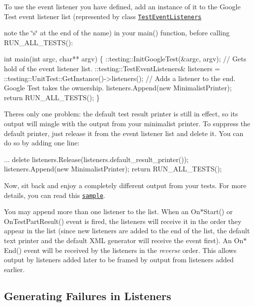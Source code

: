To use the event listener you have defined, add an instance of it to the Google Test event listener list (represented by class \href{../include/gtest/gtest.h#L929}{\tt Test\+Event\+Listeners}
\begin{DoxyItemize}
\item note the \char`\"{}s\char`\"{} at the end of the name) in your {\ttfamily main()} function, before calling {\ttfamily R\+U\+N\+\_\+\+A\+L\+L\+\_\+\+T\+E\+S\+T\+S()}\+: 
\begin{DoxyCode}
int main(int argc, char** argv) \{
  ::testing::InitGoogleTest(&argc, argv);
  // Gets hold of the event listener list.
  ::testing::TestEventListeners& listeners =
      ::testing::UnitTest::GetInstance()->listeners();
  // Adds a listener to the end.  Google Test takes the ownership.
  listeners.Append(new MinimalistPrinter);
  return RUN\_ALL\_TESTS();
\}
\end{DoxyCode}

\end{DoxyItemize}

There\textquotesingle{}s only one problem\+: the default test result printer is still in effect, so its output will mingle with the output from your minimalist printer. To suppress the default printer, just release it from the event listener list and delete it. You can do so by adding one line\+: 
\begin{DoxyCode}
...
delete listeners.Release(listeners.default\_result\_printer());
listeners.Append(new MinimalistPrinter);
return RUN\_ALL\_TESTS();
\end{DoxyCode}


Now, sit back and enjoy a completely different output from your tests. For more details, you can read this \href{../samples/sample9_unittest.cc}{\tt sample}.

You may append more than one listener to the list. When an {\ttfamily On$\ast$\+Start()} or {\ttfamily On\+Test\+Part\+Result()} event is fired, the listeners will receive it in the order they appear in the list (since new listeners are added to the end of the list, the default text printer and the default X\+ML generator will receive the event first). An {\ttfamily On$\ast$\+End()} event will be received by the listeners in the {\itshape reverse} order. This allows output by listeners added later to be framed by output from listeners added earlier.

\subsection*{Generating Failures in Listeners}

